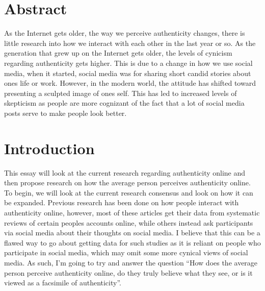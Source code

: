 \documentclass[12pt]{article}
\begin{document}
\begin{doublespace}
    \vspace*{20pt}
\section*{Abstract}
    \par As the Internet gets older, the way we perceive authenticity changes, there is little research into how we interact with each other in the last year or so.
        As the generation that grew up on the Internet gets older, the levels of cynicism regarding authenticity gets higher.
        This is due to a change in how we use social media, when it started, social media was for sharing short candid stories about ones life or work.
        However, in the modern world, the attitude has shifted toward presenting a sculpted image of ones self. 
        This has led to increased levels of skepticism as people are more cognizant of the fact that a lot of social media posts serve to make people look better.

\newpage
    \section*{Introduction}
    \par This essay will look at the current research regarding authenticity online and then propose research on how the average person perceives authenticity online.
        To begin, we will look at the current research consensus and look on how it can be expanded.
        Previous research has been done on how people interact with authenticity online, however, most of these articles get their data from systematic reviews of certain peoples accounts online,
        while others instead ask participants via social media about their thoughts on social media.
        I believe that this can be a flawed way to go about getting data for such studies as it is reliant on people who participate in social media, which may omit some more cynical views of social media.
        As such, I'm going to try and answer the question ``How does the average person perceive authenticity online, do they truly believe what they see, or is it viewed as a facsimile of authenticity''.


\end{doublespace}
\end{document}
